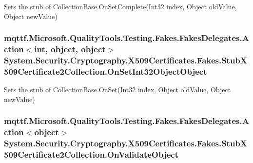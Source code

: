 Sets the stub of Collection\-Base.\-On\-Set\-Complete(\-Int32 index, Object old\-Value, Object new\-Value)

\hypertarget{class_system_1_1_security_1_1_cryptography_1_1_x509_certificates_1_1_fakes_1_1_stub_x509_certificate2_collection_a1aa75c2c759be2e9b4ecc430de4595ac}{
\subsubsection[{On\-Set\-Int32\-Object\-Object}]{\setlength{\rightskip}{0pt plus 5cm}mqttf.\-Microsoft.\-Quality\-Tools.\-Testing.\-Fakes.\-Fakes\-Delegates.\-Action$<$int, object, object$>$ System.\-Security.\-Cryptography.\-X509\-Certificates.\-Fakes.\-Stub\-X509\-Certificate2\-Collection.\-On\-Set\-Int32\-Object\-Object}}\label{class_system_1_1_security_1_1_cryptography_1_1_x509_certificates_1_1_fakes_1_1_stub_x509_certificate2_collection_a1aa75c2c759be2e9b4ecc430de4595ac}


Sets the stub of Collection\-Base.\-On\-Set(\-Int32 index, Object old\-Value, Object new\-Value)

\hypertarget{class_system_1_1_security_1_1_cryptography_1_1_x509_certificates_1_1_fakes_1_1_stub_x509_certificate2_collection_ab3aa935b2ce2db5bff05113722a463a7}{
\subsubsection[{On\-Validate\-Object}]{\setlength{\rightskip}{0pt plus 5cm}mqttf.\-Microsoft.\-Quality\-Tools.\-Testing.\-Fakes.\-Fakes\-Delegates.\-Action$<$object$>$ System.\-Security.\-Cryptography.\-X509\-Certificates.\-Fakes.\-Stub\-X509\-Certificate2\-Collection.\-On\-Validate\-Object}}\label{class_system_1_1_security_1_1_cryptography_1_1_x509_certificates_1_1_fakes_1_1_stub_x509_certificate2_collection_ab3aa935b2ce2db5bff05113722a463a7}


